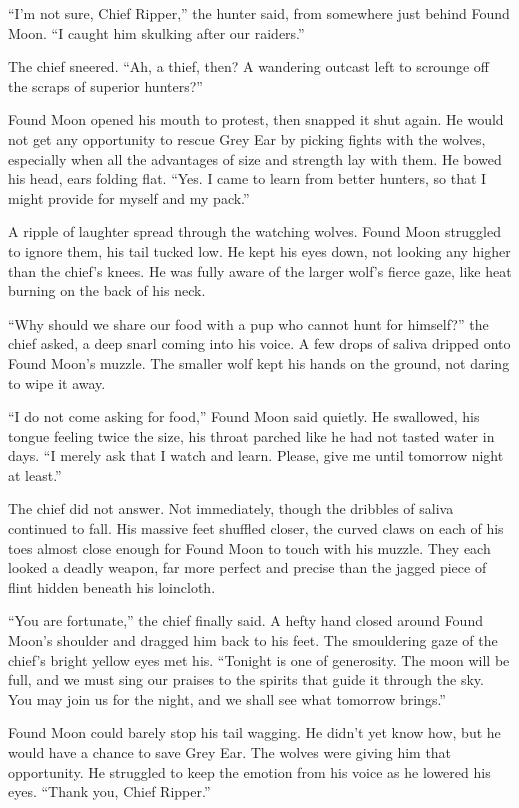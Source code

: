 ``I'm not sure, Chief Ripper,'' the hunter said, from somewhere just behind Found Moon. ``I caught him skulking after our raiders.''

The chief sneered. ``Ah, a thief, then? A wandering outcast left to scrounge off the scraps of superior hunters?''

Found Moon opened his mouth to protest, then snapped it shut again. He would not get any opportunity to rescue Grey Ear by picking fights with the wolves, especially when all the advantages of size and strength lay with them. He bowed his head, ears folding flat. ``Yes. I came to learn from better hunters, so that I might provide for myself and my pack.''

A ripple of laughter spread through the watching wolves. Found Moon struggled to ignore them, his tail tucked low. He kept his eyes down, not looking any higher than the chief's knees. He was fully aware of the larger wolf's fierce gaze, like heat burning on the back of his neck.

``Why should we share our food with a pup who cannot hunt for himself?'' the chief asked, a deep snarl coming into his voice. A few drops of saliva dripped onto Found Moon's muzzle. The smaller wolf kept his hands on the ground, not daring to wipe it away.

``I do not come asking for food,'' Found Moon said quietly. He swallowed, his tongue feeling twice the size, his throat parched like he had not tasted water in days. ``I merely ask that I watch and learn. Please, give me until tomorrow night at least.''

The chief did not answer. Not immediately, though the dribbles of saliva continued to fall. His massive feet shuffled closer, the curved claws on each of his toes almost close enough for Found Moon to touch with his muzzle. They each looked a deadly weapon, far more perfect and precise than the jagged piece of flint hidden beneath his loincloth.

``You are fortunate,'' the chief finally said. A hefty hand closed around Found Moon's shoulder and dragged him back to his feet. The smouldering gaze of the chief's bright yellow eyes met his. ``Tonight is one of generosity. The moon will be full, and we must sing our praises to the spirits that guide it through the sky. You may join us for the night, and we shall see what tomorrow brings.''

Found Moon could barely stop his tail wagging. He didn't yet know how, but he would have a chance to save Grey Ear. The wolves were giving him that opportunity. He struggled to keep the emotion from his voice as he lowered his eyes. ``Thank you, Chief Ripper.''

